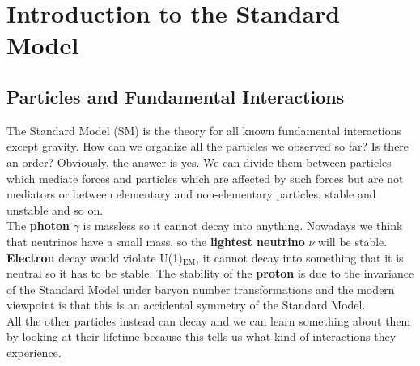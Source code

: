 \documentclass[../main.tex]{subfiles}
\begin{document}
\setchapterpreamble[u]{\margintoc}
\chapter[Introduction to the Standard Model]{Introduction to the Standard Model\footnotemark[0]}
\section{Particles and Fundamental Interactions}
The Standard Model (SM) is the theory for all known fundamental interactions except gravity. How can we organize all the particles we observed so far? Is there an order? Obviously, the answer is yes. We can divide them between particles which mediate forces and particles which are affected by such forces but are not mediators or between elementary and non-elementary particles, stable and unstable and so on.\\
The \textbf{photon} $\gamma$ is massless so it cannot decay into anything. Nowadays we think that neutrinos have a small mass, so the \textbf{lightest neutrino} $\nu$ will be stable. \textbf{Electron} decay would violate U(1)$_{\text{EM}}$, it cannot decay into something that it is neutral so it has to be stable. The stability of the \textbf{proton} is due to the invariance of the Standard Model under baryon number transformations and the modern viewpoint is that this is an accidental symmetry of the Standard Model.\\
All the other particles instead can decay and we can learn something about them by looking at their lifetime because this tells us what kind of interactions they experience.
\end{document}
